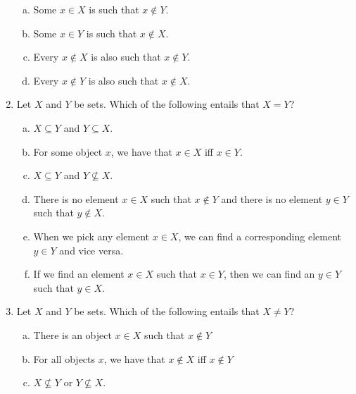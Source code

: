 \begin{enumerate}[\thesection.1]
\begin{enumerate}[(a)]
			\item Some $x\in X$ is such that $x\notin Y$.
			
			\item Some $x\in Y$ is such that $x\notin X$.
			
			\item Every $x\notin X$ is also such that $x\notin Y$.
			
			\item Every $x\notin Y$ is also such that $x\notin X$.		
					
		\end{enumerate}
		
		\item Let $X$ and $Y$ be sets. Which of the following entails that $X= Y$?
		
		\begin{enumerate}[(a)]
					
			\item $X\subseteq Y$ and $Y\subseteq X$.
					
			\item For some object $x$, we have that $x\in X$ iff $x\in Y$.

			\item $X\subseteq Y$ and $Y\nsubseteq X$.
						
			\item There is no element $x\in X$ such that $x\notin Y$ and there is no element $y\in Y$ such that $y\notin X$.
			
			\item When we pick any element $x\in X$, we can find a corresponding element $y\in Y$ and vice versa.
			
			\item If we find an element $x\in X$ such that $x\in Y$, then we can find an $y\in Y$ such that $y\in X$.
					
		\end{enumerate}

\item Let $X$ and $Y$ be sets. Which of the following entails that $X\neq Y$?
		
		\begin{enumerate}[(a)]
		
			\item There is an object $x\in X$ such that $x\notin Y$
				
			\item For all objects $x$, we have that $x\notin X$ iff $x\notin Y$
		
			\item $X\nsubseteq Y$ or $Y\nsubseteq X$.
			

\end{enumerate}
\end{enumerate}
